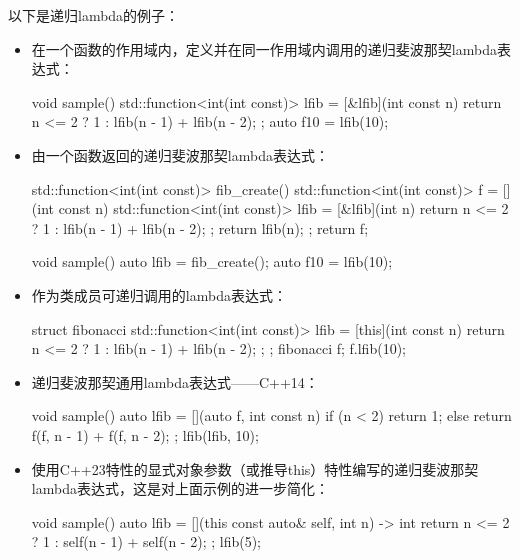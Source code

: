 以下是递归lambda的例子：

\begin{itemize}
\item
在一个函数的作用域内，定义并在同一作用域内调用的递归斐波那契lambda表达式：

\begin{cpp}
void sample()
{
    std::function<int(int const)> lfib =
    [&lfib](int const n)
    {
        return n <= 2 ? 1 : lfib(n - 1) + lfib(n - 2);
    };
    auto f10 = lfib(10);
}
\end{cpp}

\item
由一个函数返回的递归斐波那契lambda表达式：

\begin{cpp}
std::function<int(int const)> fib_create()
{
    std::function<int(int const)> f = [](int const n)
    {
        std::function<int(int const)> lfib = [&lfib](int n)
        {
            return n <= 2 ? 1 : lfib(n - 1) + lfib(n - 2);
        };
        return lfib(n);
    };
    return f;
}

void sample()
{
    auto lfib = fib_create();
    auto f10 = lfib(10);
}
\end{cpp}

\item
作为类成员可递归调用的lambda表达式：

\begin{cpp}
struct fibonacci
{
    std::function<int(int const)> lfib =
    [this](int const n)
    {
        return n <= 2 ? 1 : lfib(n - 1) + lfib(n - 2);
    };
};
fibonacci f;
f.lfib(10);
\end{cpp}

\item
递归斐波那契通用lambda表达式——C++14：

\begin{cpp}
void sample()
{
    auto lfib = [](auto f, int const n)
    {
        if (n < 2) return 1;
        else return f(f, n - 1) + f(f, n - 2);
    };
    lfib(lfib, 10);
}
\end{cpp}

\item
使用C++23特性的显式对象参数（或推导this）特性编写的递归斐波那契lambda表达式，这是对上面示例的进一步简化：

\begin{cpp}
void sample()
{
    auto lfib = [](this const auto& self, int n) -> int
    {
        return n <= 2 ? 1 : self(n - 1) + self(n - 2);
    };
    lfib(5);
}

\end{cpp}
\end{itemize}

